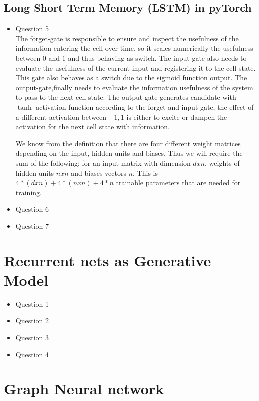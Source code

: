 \documentclass{article}
\begin{document}
\subsection{Long Short Term Memory (LSTM) in pyTorch}
\begin{itemize}
  \item Question 5 \\
  The forget-gate is responsible to ensure and inspect the usefulness of the information entering the cell over time, so it scales numerically the usefulness between $0$ and $1$ and thus behaving as switch. 
  The input-gate also needs to evaluate the usefulness of the current input and registering it to the cell state. This gate also behaves as a switch due to the sigmoid function output. The output-gate,finally needs to evaluate the information usefulness of the system to pass to the next cell state.  The output gate generates candidate with $\tanh$ activation function according to the forget and input gate, the effect of a different activation between $-1, 1$ is either to excite or dampen the activation for the next cell state with information. 

  We know from the definition that there are four different weight matrices depending on the input, hidden units and biases. Thus we will require the sum of the following; for an input matrix with dimension $d x n$, weights of hidden units $ n x n$ and biases vectors $n$. This is $4 *(d x n) + 4*( n x n) + 4 * n$  trainable parameters that are needed for training. 
  \item Question 6
  \item Question 7
\end{itemize}
\section{Recurrent nets as Generative Model}

\begin{itemize}
  \item Question 1
  \item Question 2
  \item Question 3
  \item Question 4
\end{itemize}

\section{Graph Neural network}
\end{document}

